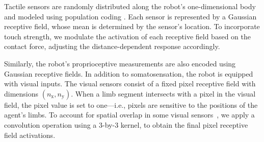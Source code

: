%


Tactile sensors are randomly distributed along the robot's one-dimensional body and modeled using population coding \cite{Panzeri2010PopulationCoding}. Each sensor is represented by a Gaussian receptive field, whose mean is determined by the sensor's location. %
To incorporate touch strength, we modulate the activation of each receptive field based on the contact force, adjusting the distance-dependent response accordingly.  

Similarly, the robot's proprioceptive measurements are also encoded using Gaussian receptive fields. In addition to somatosensation, the robot is equipped with visual inputs. The visual sensors consist of a fixed pixel receptive field with dimensions $(n_\text{x}, n_\text{y})$. When a limb segment intersects with a pixel in the visual field, the pixel value is set to one---i.e., pixels are sensitive to the positions of the agent's limbs. To account for spatial overlap in some visual sensors~\cite{Marshall2015}, we apply a convolution operation using a 3-by-3 kernel, to obtain the final pixel receptive field activations.  

